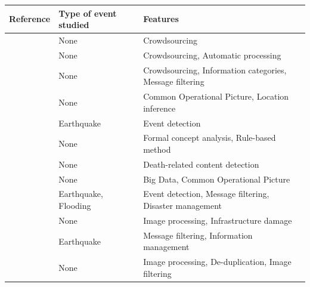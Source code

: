 \begin{table}[bp]
    \centering
    \renewcommand{\arraystretch}{1.5}
    \begin{tabular}{m{} m{} m{}}
        Reference                                        & Type of event studied & Features                                                 \\ [0.5ex]
        \toprule
        \cite{schulzCrisisInformationManagement2012a}    & None                  & Crowdsourcing                                            \\
        \cite{backfriedOpenSourceIntelligence2012a}      & None                  & Crowdsourcing, Automatic processing                      \\
        \cite{imranAIDRArtificialIntelligence2014b}      & None                  & Crowdsourcing, Information categories, Message filtering \\
        \cite{middletonRealtimeCrisisMapping2014a}       & None                  & Common Operational Picture, Location inference           \\
        \cite{avvenutiEARSEarthquakeAlert2014a}          & Earthquake            & Event detection                                          \\
        \cite{gibsonCombiningBigSocial2014a}             & None                  & Formal concept analysis, Rule-based method               \\
        \cite{glasgowOurGriefUnspeakable2014a}           & None                  & Death-related content detection                          \\
        \cite{huangDisasterMapperCyberGISFramework2015a} & None                  & Big Data, Common Operational Picture                     \\
        \cite{avvenutiPullingInformationSocial2016a}     & Earthquake, Flooding  & Event detection, Message filtering, Disaster management  \\
        \cite{alamImage4ActOnlineSocial2017a}            & None                  & Image processing, Infrastructure damage                  \\
        \cite{fersiniEarthquakeManagementDecision2017a}  & Earthquake            & Message filtering, Information management                \\
        \cite{nguyenAutomaticImageFiltering2017a}        & None                  & Image processing, De-duplication, Image filtering        \\

\end{tabular}
\end{table}
